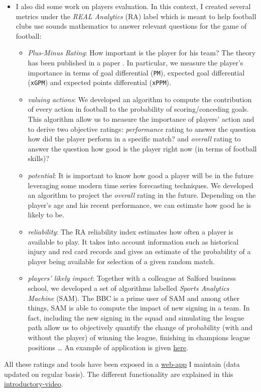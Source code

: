 \documentclass[a4paper,twoside,11pt]{article}
\begin{document}
\begin{itemize}
\item I also did some work on players evaluation. In this context, I created several
metrics under the \emph{REAL Analytics} (RA) label which is meant to help
football clubs use sounds mathematics to answer relevant questions for the game
of football:
\begin{itemize}
\item \emph{Plus-Minus Rating}: How important is the player for his team? The theory
has been published in a paper \citep{kharrat2017plusminus}. In particular,
we measure the player's importance in terms of goal differential (\texttt{PM}),
expected goal differential (\texttt{xGPM}) and expected points differential (\texttt{xPPM}).
\item \emph{valuing actions}: We developed an algorithm to compute the contribution of
every action in football to the probability of scoring/conceding goals. This
algorithm allow us to measure the importance of players' action and to
derive two objective ratings: \emph{performance} rating to answer the question how
did the player perform in a specific match? and \emph{overall} rating to answer
the question how good is the player right now (in terms of football skills)?
\item \emph{potential}: It is important to know how good a player will be in the future
leveraging some modern time series forecasting techniques. We developed an
algorithm to project the \emph{overall} rating in the future. Depending on the
player's age and his recent performance, we can estimate how good he is
likely to be.
\item \emph{reliability}: The RA reliability index estimates how often a player is
available to play. It takes into account information such as historical
injury and red card records and gives an estimate of the probability of a
player being available for selection of a given random match.
\item \emph{players' likely impact}: Together with a colleague at Salford business
school, we developed a set of algorithms labelled \emph{Sports Analytics Machine}
(SAM). The BBC is a prime user of SAM and among other things, SAM is able to
compute the impact of new signing in a team. In fact, including the new
signing in the squad and simulating the league path allow us to objectively
quantify the change of probability (with and without the player) of winning the
league, finishing in champions league positions \ldots{} An example of application
is given \href{https://www.bbc.co.uk/sport/football/37004327}{here}.
\end{itemize}
\end{itemize}
All these ratings and tools have been exposed in a \href{https://realanalytics.org}{web-app} I maintain (data
updated on regular basis). The different functionality are explained in this
\href{https://www.dropbox.com/s/k6ui3ugywcbcgtj/REAL\%20Analytics\%20demo.mp4?dl=0}{introductory-video}.
\end{document}
